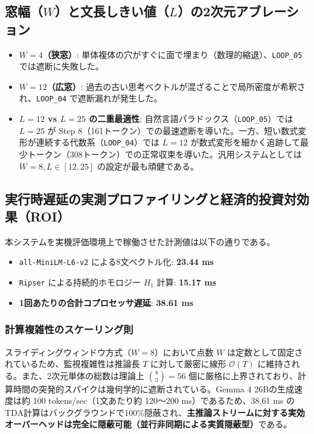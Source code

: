 \documentclass[11pt,a4paper]{article}
\begin{document}
\subsection{窓幅（$W$）と文長しきい値（$L$）の2次元アブレーション}
\begin{itemize}
    \item \textbf{$W=4$（狭窓）}: 単体複体の穴がすぐに面で埋まり（数理的縮退）、\texttt{LOOP\_05} では遮断に失敗した。
    \item \textbf{$W=12$（広窓）}: 過去の古い思考ベクトルが混ざることで局所密度が希釈され、\texttt{LOOP\_04} で遮断漏れが発生した。
    \item \textbf{$L=12$ vs $L=25$ の二重最適性}: 自然言語パラドックス（\texttt{LOOP\_05}）では $L=25$ が Step 8（161トークン）での最速遮断を導いた。一方、短い数式変形が連続する代数系（\texttt{LOOP\_04}）では $L=12$ が数式変形を細かく追跡して最少トークン（308トークン）での正常収束を導いた。汎用システムとしては $W=8, L \in [12, 25]$ の設定が最も頑健である。
\end{itemize}

\subsection{実行時遅延の実測プロファイリングと経済的投資対効果（ROI）}
本システムを実機評価環境上で稼働させた計測値は以下の通りである。
\begin{itemize}
    \item \texttt{all-MiniLM-L6-v2} による8文ベクトル化: \textbf{23.44 ms}
    \item \texttt{Ripser} による持続的ホモロジー $H_1$ 計算: \textbf{15.17 ms}
    \item \textbf{1回あたりの合計コプロセッサ遅延}: \textbf{38.61 ms}
\end{itemize}

\subsubsection{計算複雑性のスケーリング則}
スライディングウィンドウ方式（$W=8$）において点数 $W$ は定数として固定されているため、監視複雑性は推論長 $T$ に対して厳密に線形 $\mathcal{O}(T)$ に維持される。また、2次元単体の総数は理論上 $\binom{8}{3} = 56$ 個に厳格に上界されており、計算時間の突発的スパイクは幾何学的に遮断されている。Gemma 4 26Bの生成速度は約 100 tokens/sec（1文あたり約 120〜200 ms）であるため、38.61 ms のTDA計算はバックグラウンドで100\%隠蔽され、\textbf{主推論ストリームに対する実効オーバーヘッドは完全に隠蔽可能（並行非同期による実質隠蔽型）}である。
\end{document}

